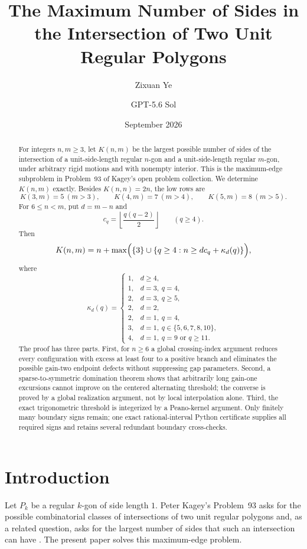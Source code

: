 \documentclass[11pt]{article}
\title{\textbf{The Maximum Number of Sides in the Intersection of Two Unit Regular Polygons}}
\author{Zixuan Ye
\and GPT-5.6 Sol}
\date{September 2026}
\theoremstyle{remark}
\begin{document}
\maketitle

\begin{abstract}
For integers $n,m\ge3$, let $K(n,m)$ be the largest possible number of sides of the intersection of a unit-side-length regular $n$-gon and a unit-side-length regular $m$-gon, under arbitrary rigid motions and with nonempty interior. This is the maximum-edge subproblem in Problem~93 of Kagey's open problem collection. We determine $K(n,m)$ exactly. Besides $K(n,n)=2n$, the low rows are
\[
K(3,m)=5\ (m>3),\qquad K(4,m)=7\ (m>4),\qquad K(5,m)=8\ (m>5).
\]
For $6\le n<m$, put $d=m-n$ and
\[
 c_q=\left\lfloor\frac{q(q-2)}2\right\rfloor\qquad(q\ge4).
\]
Then
\[
 K(n,m)=n+\max\Bigl(\{3\}\cup\{q\ge4:n\ge dc_q+\kappa_d(q)\}\Bigr),
\]
where
\[
\kappa_d(q)=
\begin{cases}
1,&d\ge4,\\
1,&d=3,\ q=4,\\
2,&d=3,\ q\ge5,\\
2,&d=2,\\
2,&d=1,\ q=4,\\
3,&d=1,\ q\in\{5,6,7,8,10\},\\
4,&d=1,\ q=9\text{ or }q\ge11.
\end{cases}
\]
The proof has three parts. First, for $n\ge6$ a global crossing-index argument reduces every configuration with excess at least four to a positive branch and eliminates the possible gain-two endpoint defects without suppressing gap parameters. Second, a sparse-to-symmetric domination theorem shows that arbitrarily long gain-one excursions cannot improve on the centered alternating threshold; the converse is proved by a global realization argument, not by local interpolation alone. Third, the exact trigonometric threshold is integerized by a Peano-kernel argument. Only finitely many boundary signs remain; one exact rational-interval Python certificate supplies all required signs and retains several redundant boundary cross-checks.
\end{abstract}

\section{Introduction}

Let $P_k$ be a regular $k$-gon of side length $1$. Peter Kagey's Problem~93 asks for the possible combinatorial classes of intersections of two unit regular polygons and, as a related question, asks for the largest number of sides that such an intersection can have \cite{Kagey93}. The present paper solves this maximum-edge problem.
\end{document}
